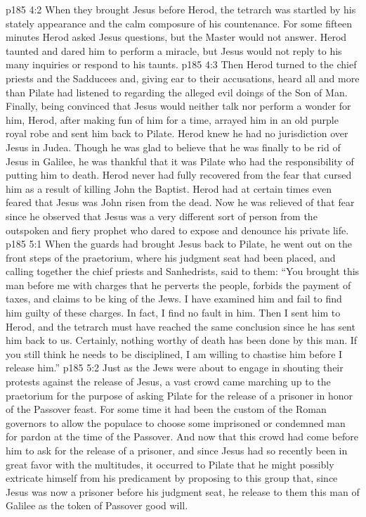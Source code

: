 \vs p185 4:2 When they brought Jesus before Herod, the tetrarch was startled by his stately appearance and the calm composure of his countenance. For some fifteen minutes Herod asked Jesus questions, but the Master would not answer. Herod taunted and dared him to perform a miracle, but Jesus would not reply to his many inquiries or respond to his taunts.
\vs p185 4:3 Then Herod turned to the chief priests and the Sadducees and, giving ear to their accusations, heard all and more than Pilate had listened to regarding the alleged evil doings of the Son of Man. Finally, being convinced that Jesus would neither talk nor perform a wonder for him, Herod, after making fun of him for a time, arrayed him in an old purple royal robe and sent him back to Pilate. Herod knew he had no jurisdiction over Jesus in Judea. Though he was glad to believe that he was finally to be rid of Jesus in Galilee, he was thankful that it was Pilate who had the responsibility of putting him to death. Herod never had fully recovered from the fear that cursed him as a result of killing John the Baptist. Herod had at certain times even feared that Jesus was John risen from the dead. Now he was relieved of that fear since he observed that Jesus was a very different sort of person from the outspoken and fiery prophet who dared to expose and denounce his private life.
\vs p185 5:1 When the guards had brought Jesus back to Pilate, he went out on the front steps of the praetorium, where his judgment seat had been placed, and calling together the chief priests and Sanhedrists, said to them: “You brought this man before me with charges that he perverts the people, forbids the payment of taxes, and claims to be king of the Jews. I have examined him and fail to find him guilty of these charges. In fact, I find no fault in him. Then I sent him to Herod, and the tetrarch must have reached the same conclusion since he has sent him back to us. Certainly, nothing worthy of death has been done by this man. If you still think he needs to be disciplined, I am willing to chastise him before I release him.”
\vs p185 5:2 Just as the Jews were about to engage in shouting their protests against the release of Jesus, a vast crowd came marching up to the praetorium for the purpose of asking Pilate for the release of a prisoner in honor of the Passover feast. For some time it had been the custom of the Roman governors to allow the populace to choose some imprisoned or condemned man for pardon at the time of the Passover. And now that this crowd had come before him to ask for the release of a prisoner, and since Jesus had so recently been in great favor with the multitudes, it occurred to Pilate that he might possibly extricate himself from his predicament by proposing to this group that, since Jesus was now a prisoner before his judgment seat, he release to them this man of Galilee as the token of Passover good will.
